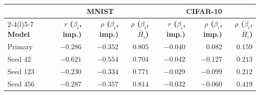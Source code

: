 \begin{table}[!htbp]
    \smallskip
    \begin{tabular}{@{}lrrrrrr@{}}
        \toprule
        & \multicolumn{3}{c}{\textbf{MNIST}} & \multicolumn{3}{c}{\textbf{CIFAR-10}} \\
        \cmidrule(lr){2-4}\cmidrule(l){5-7}
        \textbf{Model} & \textbf{$r$ ($\beta_i$, imp.)} & \textbf{$\rho$ ($\beta_i$, imp.)} & \textbf{$\rho$ ($\beta_i$, $\bar{H}_i$)} & \textbf{$r$ ($\beta_i$, imp.)} & \textbf{$\rho$ ($\beta_i$, imp.)} & \textbf{$\rho$ ($\beta_i$, $\bar{H}_i$)} \\
        \midrule
        Primary & $-0.286$ & $-0.352$ & $0.805$ & $-0.040$ & $0.082$ & $0.159$ \\
        Seed 42 & $-0.621$ & $-0.554$ & $0.704$ & $-0.042$ & $-0.127$ & $0.213$ \\
        Seed 123 & $-0.230$ & $-0.334$ & $0.771$ & $-0.029$ & $-0.099$ & $0.212$ \\
        Seed 456 & $-0.287$ & $-0.357$ & $0.814$ & $-0.032$ & $-0.060$ & $0.419$ \\
        \bottomrule
    \end{tabular}
\end{table}


